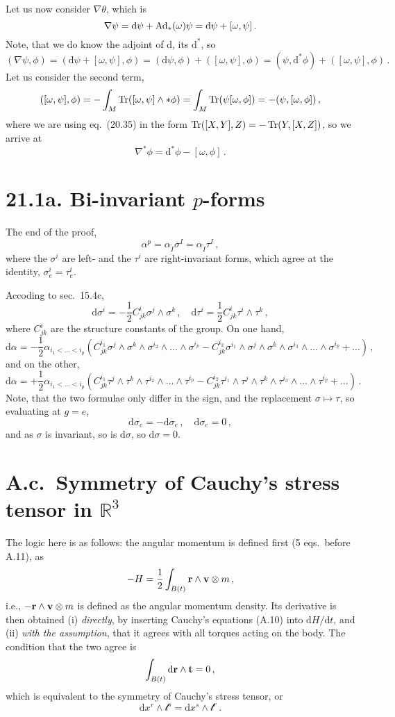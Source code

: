 \documentclass[a4paper,12pt]{article}
\def\d{\mathrm{d}}
\def\Tr{\ensuremath{\mathop{\rm Tr}}}
\begin{document}
Let us now consider $\nabla \theta$, which is
\[
 \nabla \psi = \d\psi + {\rm Ad}_* (\omega) \psi  = \d\psi + [\omega, \psi]\,.
\]
Note, that we do know the adjoint of $\d$, its $\d^*$, so
\[
 (\nabla\psi, \phi) = (\d\psi + [\omega,\psi], \phi) = (\d\psi, \phi) + ([\omega, \psi], \phi) = (\psi, \d^*\phi) + ([\omega, \psi], \phi)\,.
\]
Let us consider the second term,
\[
 ([\omega, \psi], \phi) = -\int_M \Tr( [\omega, \psi] \wedge *\phi) = \int_M \Tr(\psi [\omega, \phi]) = -(\psi, [\omega, \phi])\,,
\]
where we are using eq.\ (20.35) in the form $\Tr([X,Y],Z) = -\Tr(Y, [X,Z])$, so we arrive at
\[
 \nabla^* \phi = \d^*\phi -[\omega, \phi]\,.
\]


\section*{21.1a. Bi-invariant $p$-forms}

The end of the proof,
\[
 \alpha^p = \alpha_{\underrightarrow{I}} \sigma^I = \alpha_{\underrightarrow{I}} \tau^I\,,
\]
where the $\sigma^i$ are left- and the $\tau^i$ are right-invariant forms, which agree at the identity, $\sigma^i_e = \tau^i_e$.

Accoding to sec.\ 15.4c,
\[
 \d\sigma^i = -\frac{1}{2}C^i_{jk}\sigma^j\wedge\sigma^k\,,\quad \d\tau^i = \frac{1}{2}C^i_{jk}\tau^i\wedge\tau^k\,,
\]
where $C^i_{jk}$ are the structure constants of the group. On one hand,
\[
 \d\alpha = -\frac{1}{2}\alpha_{i_1 < \dots < i_p}\left( C^{i_1}_{jk} \sigma^j\wedge \sigma^k \wedge \sigma^{i_2}\wedge\dots\wedge \sigma^{i_p} - C^{i_2}_{jk}\sigma^{i_1}\wedge\sigma^j\wedge\sigma^k\wedge\sigma^{i_3}\wedge\dots\wedge\sigma^{i_p}+\dots \right)\,,
\]
and on the other,
\[
 \d\alpha = +\frac{1}{2}\alpha_{i_1 < \dots < i_p}\left( C^{i_1}_{jk} \tau^j\wedge \tau^k \wedge \tau^{i_2}\wedge\dots\wedge \tau^{i_p} - C^{i_2}_{jk}\tau^{i_1}\wedge\tau^j\wedge\tau^k\wedge\tau^{i_3}\wedge\dots\wedge\tau^{i_p}+\dots \right)\,.
\]
Note, that the two formulae only differ in the sign, and the replacement $\sigma\mapsto\tau$, so evaluating at $g=e$,
\[
 \d\sigma_e = -\d\sigma_e\,,\quad \d\sigma_e=0\,,
\]
and as $\sigma$ is invariant, so is $\d\sigma$, so $\d\sigma=0$.

\section*{A.c.\ Symmetry of Cauchy's stress tensor in $\mathbb{R}^3$}

The logic here is as follows: the angular momentum is defined first (5 eqs.\ before A.11), as
\[
 - H = \frac{1}{2}\int_{B(t)} {\bf r} \wedge {\bf v}\otimes m\,,
\]
i.e., $-{\bf r}\wedge {\bf v}\otimes m$ is defined as the angular momentum density. Its derivative is then obtained (i) {\sl directly}, by inserting Cauchy's equations (A.10) into $\d H / \d t$, and (ii) {\sl with the assumption}, that it agrees with all torques acting on the body. The condition that the two agree is
\[
 \int_{B(t)} \d {\bf r}\wedge {\bf t} = 0\,,
\]
which is equivalent to the symmetry of Cauchy's stress tensor, or
\[
 \d x^r \wedge  \mathcal{t}^s = \d x^s \wedge \mathcal{t}^r\,.
\]
\end{document}
